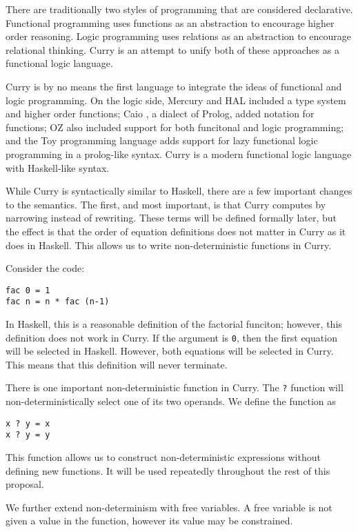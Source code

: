 
There are traditionally two styles of programming that are considered declarative.
Functional programming uses functions as an abstraction to encourage higher order reasoning.
Logic programming uses relations as an abstraction to encourage relational thinking.
Curry is an attempt to unify both of these approaches as a functional logic language.

Curry is by no means the first language to integrate the ideas of functional and logic programming.
On the logic side, Mercury \cite{} and HAL \cite{} included a type system and higher order functions;
Caio \cite{}, a dialect of Prolog, added notation for functions;
OZ \cite{} also included support for both funcitonal and logic programming;
and the Toy programming language \cite{} adds support for lazy functional logic programming in a prolog-like syntax.
Curry \cite{} is a modern functional logic language with Haskell-like syntax.

While Curry is syntactically similar to Haskell, there are a few important changes to the semantics.
The first, and most important, is that Curry computes by narrowing instead of rewriting.
These terms will be defined formally later, but the effect is that the order of equation definitions does not matter
in Curry as it does in Haskell.
This allows us to write non-deterministic functions in Curry.

Consider the code:
\begin{verbatim}
fac 0 = 1
fac n = n * fac (n-1)
\end{verbatim}

In Haskell, this is a reasonable definition of the factorial funciton; however, this definition does not work in Curry.
If the argument is \texttt 0, then the first equation will be selected in Haskell.
However, both equations will be selected in Curry.  This means that this definition will never terminate.

There is one important non-deterministic function in Curry.
The \texttt{?} function will non-deterministically select one of its two operands.
We define the function as

\begin{verbatim}
x ? y = x
x ? y = y
\end{verbatim}

This function allows us to construct non-deterministic expressions without defining new functions.
It will be used repeatedly throughout the rest of this proposal.

We further extend non-determinism with free variables.
A free variable is not given a value in the function, however its value may be constrained.

